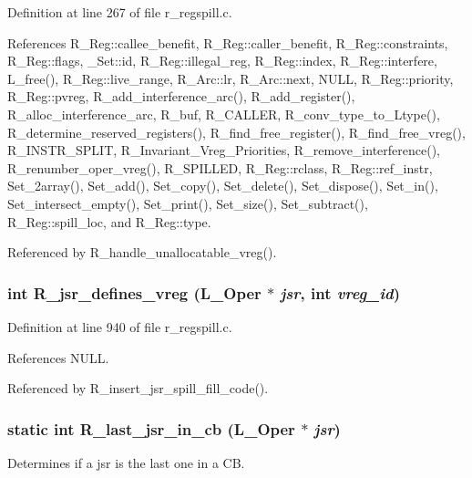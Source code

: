 Definition at line 267 of file r\_\-regspill.c.

References R\_\-Reg::callee\_\-benefit, R\_\-Reg::caller\_\-benefit, R\_\-Reg::constraints, R\_\-Reg::flags, \_\-Set::id, R\_\-Reg::illegal\_\-reg, R\_\-Reg::index, R\_\-Reg::interfere, L\_\-free(), R\_\-Reg::live\_\-range, R\_\-Arc::lr, R\_\-Arc::next, NULL, R\_\-Reg::priority, R\_\-Reg::pvreg, R\_\-add\_\-interference\_\-arc(), R\_\-add\_\-register(), R\_\-alloc\_\-interference\_\-arc, R\_\-buf, R\_\-CALLER, R\_\-conv\_\-type\_\-to\_\-Ltype(), R\_\-determine\_\-reserved\_\-registers(), R\_\-find\_\-free\_\-register(), R\_\-find\_\-free\_\-vreg(), R\_\-INSTR\_\-SPLIT, R\_\-Invariant\_\-Vreg\_\-Priorities, R\_\-remove\_\-interference(), R\_\-renumber\_\-oper\_\-vreg(), R\_\-SPILLED, R\_\-Reg::rclass, R\_\-Reg::ref\_\-instr, Set\_\-2array(), Set\_\-add(), Set\_\-copy(), Set\_\-delete(), Set\_\-dispose(), Set\_\-in(), Set\_\-intersect\_\-empty(), Set\_\-print(), Set\_\-size(), Set\_\-subtract(), R\_\-Reg::spill\_\-loc, and R\_\-Reg::type.

Referenced by R\_\-handle\_\-unallocatable\_\-vreg().
\subsubsection{\setlength{\rightskip}{0pt plus 5cm}int R\_\-jsr\_\-defines\_\-vreg (L\_\-Oper $\ast$ {\em jsr}, int {\em vreg\_\-id})}\label{r__regspill_8c_735a121bb45e5a19217cae1224f23bcb}




Definition at line 940 of file r\_\-regspill.c.

References NULL.

Referenced by R\_\-insert\_\-jsr\_\-spill\_\-fill\_\-code().
\subsubsection{\setlength{\rightskip}{0pt plus 5cm}static int R\_\-last\_\-jsr\_\-in\_\-cb (L\_\-Oper $\ast$ {\em jsr})\hspace{0.3cm}{\tt  [static]}}\label{r__regspill_8c_2006e634fa5bcd5d8706f61534879f98}


Determines if a jsr is the last one in a CB. 

